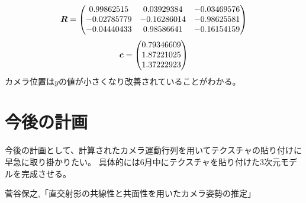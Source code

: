 \documentclass[]{jarticle}          %
\begin{document}
\begin{equation}
  \mbox{\boldmath $R$} =
  \begin{pmatrix}
    0.99862515 & 0.03929384 & -0.03469576 \\ 
    -0.02785779 & -0.16286014 & -0.98625581 \\
    -0.04440433 & 0.98586641 & -0.16154159 \\
  \end{pmatrix}
\end{equation}
\begin{equation}
  \mbox{\boldmath $c$} =
  \begin{pmatrix}
    0.79346609 \\
    1.87221025 \\
    1.37222923 \\
  \end{pmatrix}
\end{equation}
カメラ位置は$y$の値が小さくなり改善されていることがわかる。
\section{今後の計画}
今後の計画として、計算されたカメラ運動行列を用いてテクスチャの貼り付けに早急に取り掛かりたい。
具体的には6月中にテクスチャを貼り付けた3次元モデルを完成させる。

\begin{thebibliography}{99}
 菅谷保之,「直交射影の共線性と共面性を用いたカメラ姿勢の推定」
\end{thebibliography}
\end{document}
